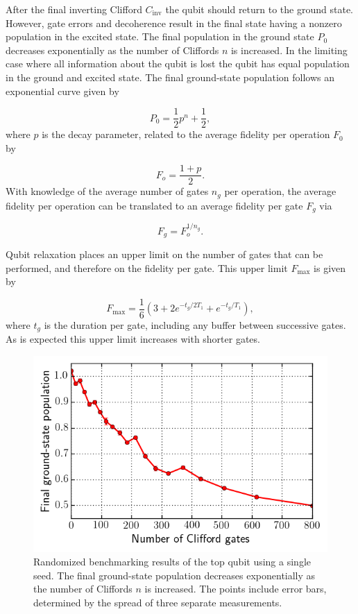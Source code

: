       After the final inverting Clifford $C_\text{inv}$ the qubit should return to the ground state. However, gate errors and decoherence result in the final state having a nonzero population in the excited state. The final population in the ground state $P_0$ decreases exponentially as the number of Cliffords $n$ is increased. In the limiting case where all information about the qubit is lost the qubit has equal population in the ground and excited state. The final ground-state population follows an exponential curve  given by~\cite{knill2008randomized}

      \begin{equation}
        P_0= \frac{1}{2} p^n + \frac{1}{2},
        \label{eq:RB exponential decay}
      \end{equation}
      where $p$ is the decay parameter, related to the average fidelity per operation $F_0$ by~\cite{magesan2011scalable}

      \begin{equation}
        F_o = \frac{1+p}{2}.
      \end{equation}
      With knowledge of the average number of gates $n_g$ per operation, the average fidelity per operation can be translated to an average fidelity per gate $F_g$ via

      \begin{equation}
        F_g = F_o^{1/n_g}.
      \end{equation}

      Qubit relaxation places an upper limit on the number of gates that can be performed, and therefore on the fidelity per gate. This upper limit $F_\text{max}$ is given by~\cite{T1_derivation}

      \begin{equation}
        F_\text{max} = \frac{1}{6}\left(3 + 2 e^{-t_g/2 T_1} + e^{-t_g/T_1}\right),
        \label{eq:RB T1 fidelity limit}
      \end{equation}
      where $t_g$ is the duration per gate, including any buffer between successive gates. As is expected this upper limit increases with shorter gates.

      \begin{figure}[h]
        \centering
        \includegraphics[width=.6\textwidth]{Figures/Randomized benchmarking/RB_single_seed.png}
        \caption{Randomized benchmarking results of the top qubit using a single seed. The final ground-state population decreases exponentially as the number of Cliffords $n$ is increased. The points include error bars, determined by the spread of three separate measurements.}
        \label{fig:RB single seed}
      \end{figure}

